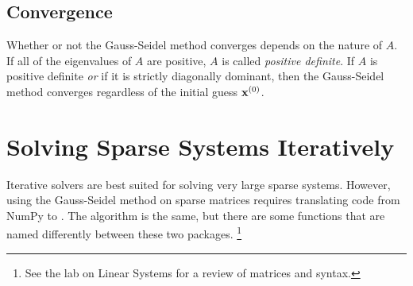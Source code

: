 \subsection*{Convergence} %

Whether or not the Gauss-Seidel method converges depends on the nature of $A$.
If all of the eigenvalues of $A$ are positive, $A$ is called \emph{positive definite}.
If $A$ is positive definite \emph{or} if it is strictly diagonally dominant, then the Gauss-Seidel method converges regardless of the initial guess $\mathbf{x}^{(0)}$.

\begin{comment} %
\begin{problem} %
The Gauss-Seidel method is faster than the standard system solver used by SciPy's \li{la.solve()} if the system is sufficiently large and sufficiently sparse.
For $n=5,6,\ldots,11$, generate a random $2^n \times 2^n$ matrix $A$ using \li{diag_dom()} and a random $2^n$ vector $\b$.
Time how long it takes to solve $A\x = \b$ using your Gauss-Seidel function from Problem \ref{prob:gauss_seidel}, and how long it takes to solve using \li{la.solve()}.
Make a log-log plot of the times against the system size.
\end{problem}
\end{comment}

\section*{Solving Sparse Systems Iteratively} %

Iterative solvers are best suited for solving very large sparse systems.
However, using the Gauss-Seidel method on sparse matrices requires translating code from NumPy to .
The algorithm is the same, but there are some functions that are named differently between these two packages.%
\footnote{See the lab on Linear Systems for a review of  matrices and syntax.}

